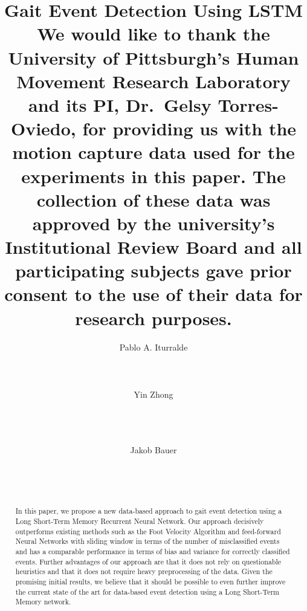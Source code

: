 \documentclass{acm_proc_article-sp}
\begin{document}
\title
{
	Gait Event Detection Using LSTM%
    \titlenote
    {
        We would like to thank the University of Pittsburgh's Human Movement
        Research Laboratory and its PI, Dr.~Gelsy Torres-Oviedo, for providing
        us with the motion capture data used for the experiments in this paper.
        The collection of these data was approved by the university's
        Institutional Review Board and all participating subjects gave prior
        consent to the use of their data for research purposes.
    }
}


\author{
    \alignauthor
    Pablo A. Iturralde\\
        \\
        \\
        \\
    \alignauthor
    Yin Zhong\\
        \\
        \\
        \\
    \and
    \alignauthor Jakob Bauer\\
        \\
        \\
        \\
}

\maketitle

\thispagestyle{empty}

\begin{abstract}
    In this paper, we propose a new data-based approach to gait event detection 
    using a Long Short-Term Memory Recurrent Neural Network.
    Our approach decisively outperforms existing methods such as the Foot 
    Velocity Algorithm and feed-forward Neural Networks with sliding window 
    in terms of the number of misclassified events and has a comparable 
    performance in terms of bias and variance for correctly classified events.
    Further advantages of our approach are that it does not rely on
    questionable heuristics and that it does not require heavy preprocessing 
    of the data.
    Given the promising initial results, we believe that it should be possible 
    to even further improve the current state of the art for data-based event 
    detection using a Long Short-Term Memory network.
\end{abstract}
\end{document}
